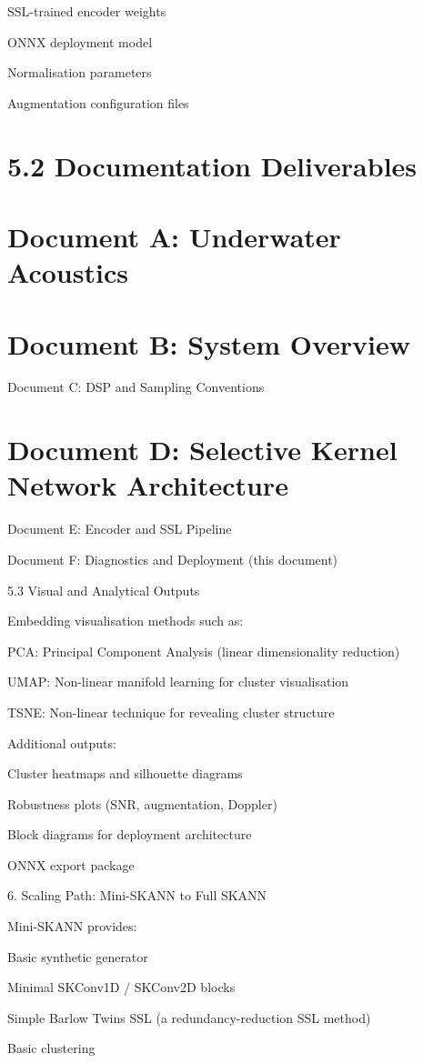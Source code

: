 \documentclass[12pt]{article}
\begin{document}
SSL-trained encoder weights

ONNX deployment model

Normalisation parameters

Augmentation configuration files

\section*{5.2 Documentation Deliverables}
\section*{Document A: Underwater Acoustics}
\section*{Document B: System Overview}
Document C: DSP and Sampling Conventions

\section*{Document D: Selective Kernel Network Architecture}
Document E: Encoder and SSL Pipeline

Document F: Diagnostics and Deployment (this document)

5.3 Visual and Analytical Outputs

Embedding visualisation methods such as:

PCA: Principal Component Analysis (linear dimensionality reduction)

UMAP: Non-linear manifold learning for cluster visualisation

TSNE: Non-linear technique for revealing cluster structure

Additional outputs:

Cluster heatmaps and silhouette diagrams

Robustness plots (SNR, augmentation, Doppler)

Block diagrams for deployment architecture

ONNX export package

6. Scaling Path: Mini-SKANN to Full SKANN

Mini-SKANN provides:

Basic synthetic generator

Minimal SKConv1D / SKConv2D blocks

Simple Barlow Twins SSL (a redundancy-reduction SSL method)

Basic clustering
\end{document}
